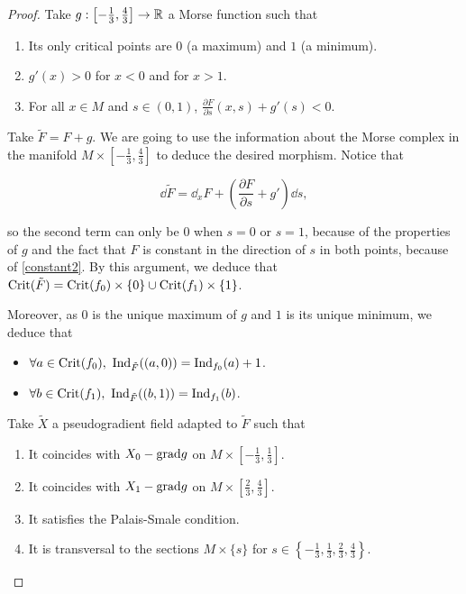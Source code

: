\begin{proof}
Take $g : \left[-\frac13,\frac43\right] \rightarrow \mathbb{R}$ a Morse function such that

\begin{enumerate}
	\item Its only critical points are $0$ (a maximum) and $1$ (a minimum).
	\item $g'(x) > 0$ for $x < 0$ and for $x > 1$.
	\item For all $x \in M$ and $s \in (0,1)$, $\frac{\partial F}{\partial s}(x,s) + g'(s) < 0$.
\end{enumerate}

Take $\tilde{F} = F + g$. We are going to use the information about the Morse complex in the manifold $M \times \left[-\frac13,\frac43\right]$ to deduce the desired morphism. Notice that

\begin{displaymath}
\dd\tilde{F} = \dd_xF + \left( \frac{\partial F}{\partial s} + g' \right) \dd s ,
\end{displaymath}

so the second term can only be $0$ when $s=0$ or $s=1$, because of the properties of $g$ and the fact that $F$ is constant in the direction of $s$ in both points, because of \ref{constant2}. By this argument, we deduce that $\text{Crit}(\tilde{F}) = \text{Crit}(f_0) \times \{0\} \cup \text{Crit}(f_1) \times \{1\}$.

Moreover, as $0$ is the unique maximum of $g$ and $1$ is its unique minimum, we deduce that

\begin{itemize}
	\item $\forall a \in \crit(f_0), \ \indx_{\tilde{F}}((a,0)) = \indx_{f_0}(a) + 1$.
	\item $\forall b \in \crit(f_1), \ \indx_{\tilde{F}}((b,1)) = \indx_{f_1}(b)$.
\end{itemize}

Take $\tilde{X}$ a pseudogradient field adapted to $\tilde{F}$ such that

\begin{enumerate}
	\item It coincides with $X_0 - \text{grad} g$ on $M \times \left[-\frac13,\frac13\right]$.
	\item It coincides with $X_1 - \text{grad} g$ on $M \times \left[\frac23,\frac43\right]$.
	\item It satisfies the Palais-Smale condition.
	\item It is transversal to the sections $M \times \{s\}$ for $s \in \left\{-\frac13,\frac13,\frac23,\frac43\right\}$.
\end{enumerate}


\end{proof}

